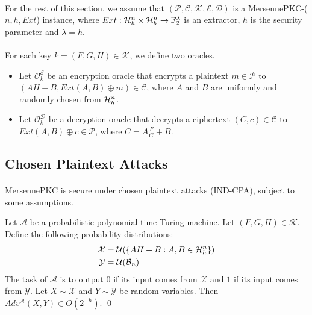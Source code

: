 \paragraph{}
For the rest of this section, we assume that $(\mathcal{P}, \mathcal{C}, \mathcal{K}, \mathcal{E}, \mathcal{D})$ is a MersennePKC-($n, h, Ext$) instance, where $Ext: \mathcal{H}_h^n \times \mathcal{H}_h^n \rightarrow \mathbb{F}_2^\lambda$ is an extractor, $h$ is the security parameter and $\lambda = h$.

\paragraph{}
For each key $k = (F, G, H) \in \mathcal{K}$, we define two oracles.
\begin{itemize}
    \item Let $\mathcal{O}_k^\mathcal{E}$ be an encryption oracle that encrypts a plaintext $m \in \mathcal{P}$ to $(AH + B, Ext(A, B) \oplus m) \in \mathcal{C}$, where $A$ and $B$ are uniformly and randomly chosen from $\mathcal{H}_h^n$.
    \item Let $\mathcal{O}_k^\mathcal{D}$ be a decryption oracle that decrypts a ciphertext $(C, c) \in \mathcal{C}$ to $Ext(A, B) \oplus c \in \mathcal{P}$, where $C = A \frac{F}{G} + B$.
\end{itemize}

\subsection{Chosen Plaintext Attacks}
\paragraph{}
MersennePKC is secure under chosen plaintext attacks (IND-CPA), subject to some assumptions.

\begin{assumption}\label{assumpt_pubkey_appears_uniform}
Let $\mathcal{A}$ be a probabilistic polynomial-time Turing machine. Let $(F, G, H) \in \mathcal{K}$. Define the following probability distributions:
\begin{align*}
\mathcal{X} &= \mathcal{U}(\{ AH + B: A, B \in \mathcal{H}_h^n  \})\\
\mathcal{Y} &= \mathcal{U}(\mathcal{B}_n)
\end{align*}
The task of $\mathcal{A}$ is to output $0$ if its input comes from $\mathcal{X}$ and $1$ if its input comes from $\mathcal{Y}$. Let $X \sim \mathcal{X}$ and $Y \sim \mathcal{Y}$ be random variables. Then $Adv^\mathcal{A}(X, Y) \in O(2^{-h})$.
\qed
\end{assumption}

